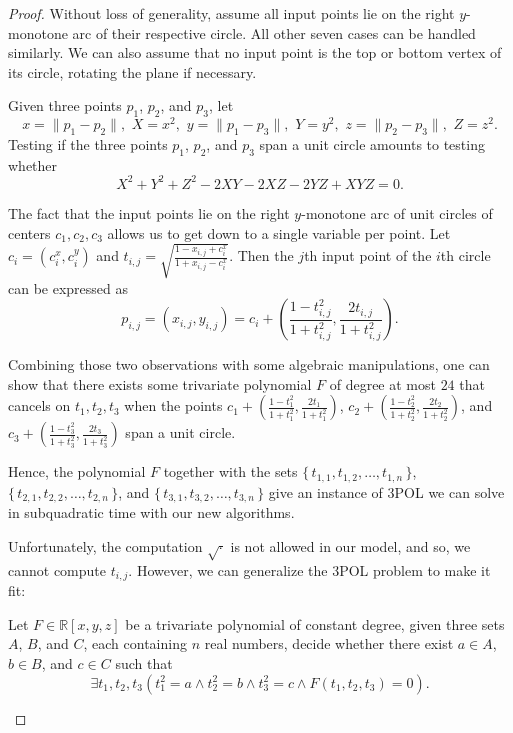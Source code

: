 \begin{proof}
	Without loss of generality, assume all input points lie on the right
	$y$-monotone arc of their respective circle. All other seven cases can be
	handled similarly. We can also assume that no input point is the top or
	bottom vertex of its circle, rotating the plane if necessary.

	Given three points $p_1$, $p_2$, and $p_3$, let
	\begin{displaymath}
		x=\lVert p_1 - p_2 \rVert,\,\,
		X=x^2,\,\,
		y=\lVert p_1 - p_3 \rVert,\,\,
		Y=y^2,\,\,
		z=\lVert p_2 - p_3 \rVert,\,\,
		Z=z^2.
	\end{displaymath}
	Testing if the three points $p_1$, $p_2$, and $p_3$ span a unit circle
	amounts to testing whether
	\begin{displaymath}
		X^2 + Y^2 + Z^2 - 2XY - 2XZ - 2YZ + XYZ = 0.
	\end{displaymath}

	The fact that the input points lie on the right $y$-monotone arc of unit
	circles of centers $c_1,c_2,c_3$ allows us to get down to a single variable
	per point. Let $c_i = (c_i^x,c_i^y)$ and
	$t_{i,j} = \sqrt{\frac{1 - x_{i,j} + c_i^x}{1 + x_{i,j} - c_i^x}}$. Then
	the \(j\)th input point of the \(i\)th circle can be expressed as
	\begin{displaymath}
		p_{i,j} = (x_{i,j},y_{i,j}) = c_i + \left(\frac{1-t_{i,j}^2}{1+t_{i,j}^2},\frac{2
		t_{i,j}}{1+t_{i,j}^2}\right).
	\end{displaymath}

	Combining those two observations with some algebraic manipulations, one can
	show that there exists some trivariate polynomial $F$ of degree at most
	$24$ that cancels on $t_1,t_2,t_3$ when the points $c_1
	+\left(\frac{1-t_1^2}{1+t_1^2},\frac{2t_1}{1+t_1^2}\right)$, $c_2
	+\left(\frac{1-t_2^2}{1+t_2^2},\frac{2t_2}{1+t_2^2}\right)$, and $c_3
	+\left(\frac{1-t_3^2}{1+t_3^2},\frac{2t_3}{1+t_3^2}\right)$ span a unit
	circle.

	Hence,
	the polynomial \(F\)
	together with
	the sets
	$\{\,t_{1,1},t_{1,2},\ldots,t_{1,n}\,\}$,
	$\{\,t_{2,1},t_{2,2},\ldots,t_{2,n}\,\}$, and
	$\{\,t_{3,1},t_{3,2},\ldots,t_{3,n}\,\}$
	give an instance of 3POL we can solve in subquadratic
	time with our new algorithms.

	Unfortunately, the computation $\sqrt{\cdot}$ is not allowed in our model, and
	so, we cannot compute $t_{i,j}$.
	However, we can generalize the 3POL problem to make it fit:
	\begin{problem}
		Let $F \in \mathbb{R}[x,y,z]$ be a trivariate polynomial of constant degree,
		given three sets $A$, $B$, and $C$, each containing $n$ real numbers, decide
		whether there exist $a \in A$, $b \in B$, and $c \in C$ such that
		\begin{displaymath}
			\exists t_1,t_2,t_3
			(t_1^2 = a \land
			t_2^2 = b \land
			t_3^2 = c \land
			F(t_1,t_2,t_3) = 0).
		\end{displaymath}
	\end{problem}


\end{proof}
